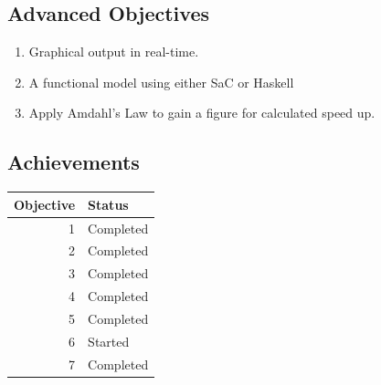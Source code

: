 \documentclass[11pt]{article} %
\begin{document}
\subsection*{Advanced Objectives}
\begin{enumerate}
\setcounter{enumi}{\value{saveenum}}
\item Graphical output in real-time.
\item A functional model using either SaC or Haskell
\item Apply Amdahl's Law to gain a figure for calculated speed up.
\end{enumerate}
\subsection{Achievements}
\begin{table}[h]
\centering
\begin{tabular}{|r|l|}
\hline {\bf Objective} & {\bf Status} \\ 
\hline 1 &  Completed\\ 
\hline 2 &  Completed\\ 
\hline 3 &  Completed\\ 
\hline 4 &  Completed\\ 
\hline 
\hline 5 &  Completed\\ 
\hline 6 &  Started \\ 
\hline 7 &  Completed\\ 
\hline 
\end{tabular} 
\end{table}
\end{document}
